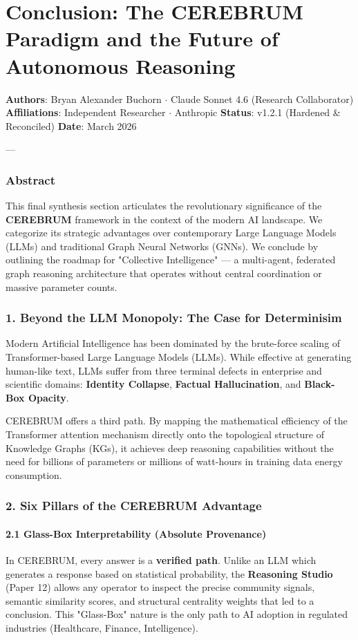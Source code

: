 \section{Conclusion: The CEREBRUM Paradigm and the Future of Autonomous Reasoning}

\textbf{Authors}: Bryan Alexander Buchorn $\cdot$ Claude Sonnet 4.6 (Research Collab\-orator)  
\textbf{Affili\-ations}: Independent Researcher $\cdot$ Anthropic  
\textbf{Status}: v1.2.1 (Hardened \& Reconciled)  
\textbf{Date}: March 2026

---

\subsubsection{Abstract}
This final synthesis section articulates the revol\-utionary signi\-ficance of the \textbf{CEREBRUM} framework in the context of the modern AI landscape. We categorize its strategic advantages over conte\-mporary Large Language Models (LLMs) and traditional Graph Neural Networks (GNNs). We conclude by outlining the roadmap for "Collective Intell\-igence" — a multi-agent, federated graph reasoning archi\-tecture that operates without central coord\-ination or massive parameter counts.

\subsubsection{1. Beyond the LLM Monopoly: The Case for Determ\-inisim}
Modern Artificial Intell\-igence has been dominated by the brute-force scaling of Transformer-based Large Language Models (LLMs). While effective at generating human-like text, LLMs suffer from three terminal defects in enterprise and scientific domains: \textbf{Identity Collapse}, \textbf{Factual Halluc\-ination}, and \textbf{Black-Box Opacity}. 

CEREBRUM offers a third path. By mapping the mathe\-matical efficiency of the Transformer attention mechanism directly onto the topological structure of Knowledge Graphs (KGs), it achieves deep reasoning capab\-ilities without the need for billions of parameters or millions of watt-hours in training data energy consumption.

\subsubsection{2. Six Pillars of the CEREBRUM Advantage}

\paragraph{2.1 Glass-Box Interp\-retability (Absolute Provenance)}
In CEREBRUM, every answer is a \textbf{verified path}. Unlike an LLM which generates a response based on statistical probability, the \textbf{Reasoning Studio} (Paper 12) allows any operator to inspect the precise community signals, semantic similarity scores, and structural centrality weights that led to a conclusion. This "Glass-Box" nature is the only path to AI adoption in regulated industries (Healthcare, Finance, Intell\-igence).

